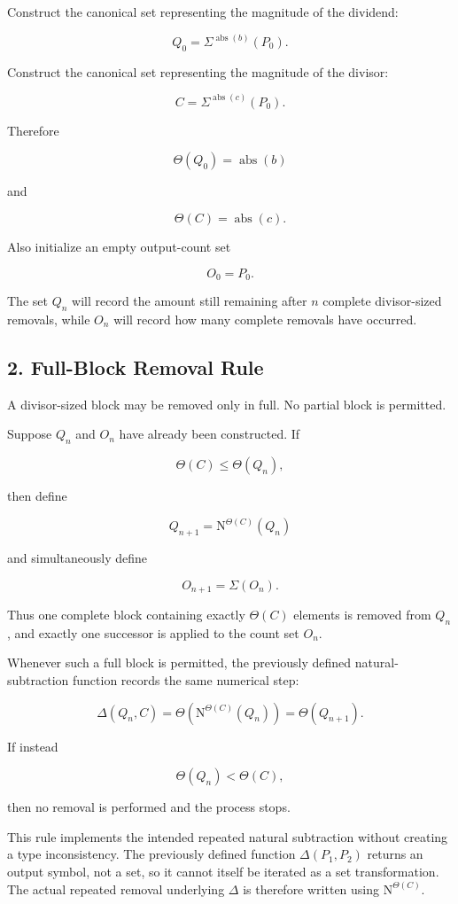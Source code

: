 \documentclass[12pt]{article}
\newcommand{\Nu}{\mathrm{N}}
\begin{document}
Construct the canonical set representing the magnitude of the dividend:

\[
Q_0
=
\Sigma^{\operatorname{abs}(b)}(P_0).
\]

Construct the canonical set representing the magnitude of the divisor:

\[
C
=
\Sigma^{\operatorname{abs}(c)}(P_0).
\]

Therefore

\[
\Theta(Q_0)=\operatorname{abs}(b)
\]

and

\[
\Theta(C)=\operatorname{abs}(c).
\]

Also initialize an empty output-count set

\[
O_0=P_0.
\]

The set \(Q_n\) will record the amount still remaining after \(n\) complete divisor-sized removals, while \(O_n\) will record how many complete removals have occurred.

\subsection*{2. Full-Block Removal Rule}

A divisor-sized block may be removed only in full. No partial block is permitted.

Suppose \(Q_n\) and \(O_n\) have already been constructed. If

\[
\Theta(C)\leq\Theta(Q_n),
\]

then define

\[
\boxed{
Q_{n+1}
=
\Nu^{\Theta(C)}(Q_n)
}
\]

and simultaneously define

\[
\boxed{
O_{n+1}=\Sigma(O_n).
}
\]

Thus one complete block containing exactly \(\Theta(C)\) elements is removed from \(Q_n\), and exactly one successor is applied to the count set \(O_n\).

Whenever such a full block is permitted, the previously defined natural-subtraction function records the same numerical step:

\[
\Delta(Q_n,C)
=
\Theta\left(\Nu^{\Theta(C)}(Q_n)\right)
=
\Theta(Q_{n+1}).
\]

If instead

\[
\Theta(Q_n)<\Theta(C),
\]

then no removal is performed and the process stops.

This rule implements the intended repeated natural subtraction without creating a type inconsistency. The previously defined function \(\Delta(P_1,P_2)\) returns an output symbol, not a set, so it cannot itself be iterated as a set transformation. The actual repeated removal underlying \(\Delta\) is therefore written using \(\Nu^{\Theta(C)}\).
\end{document}
